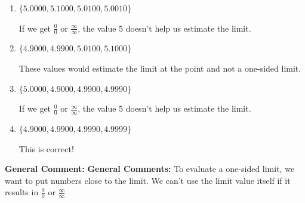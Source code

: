 \documentclass{extbook}[14pt]
\begin{document}
\begin{enumerate}
{\begin{enumerate}[label=\Alph*.]
These values would estimate the limit of 5 on the right.
\item \( \{ 5.0000, 5.1000, 5.0100, 5.0010 \} \)

If we get $\frac{0}{0}$ or $\frac{\infty}{\infty}$, the value 5 doesn't help us estimate the limit.
\item \( \{ 4.9000, 4.9900, 5.0100, 5.1000 \} \)

These values would estimate the limit at the point and not a one-sided limit.
\item \( \{ 5.0000, 4.9000, 4.9900, 4.9990 \} \)

If we get $\frac{0}{0}$ or $\frac{\infty}{\infty}$, the value 5 doesn't help us estimate the limit.
\item \( \{ 4.9000, 4.9900, 4.9990, 4.9999 \} \)

This is correct!
\end{enumerate}

\textbf{General Comment:} \textbf{General Comments:} To evaluate a one-sided limit, we want to put numbers close to the limit. We can't use the limit value itself if it results in $\frac{0}{0}$ or $\frac{\infty}{\infty}$
}
\end{enumerate}
\end{document}
